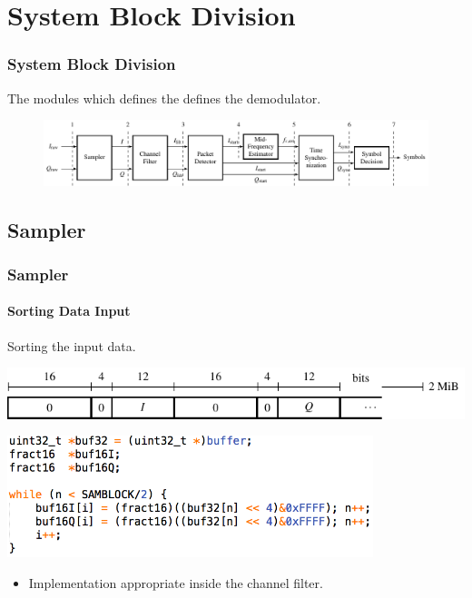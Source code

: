 
\section{System Block Division}
\begin{frame}[c] \frametitle{System Block Division}
The modules which defines the defines the demodulator.
    \begin{figure}[htbp]
        \centering
        \includegraphics[width=1\textwidth]{img/interfaces}
    \end{figure}
\end{frame}


\subsection{Sampler} \label{sec:sampler}

\begin{frame} \frametitle{Sampler}
    \framesubtitle{Sorting Data Input}
Sorting the input data.
    \begin{center}
        \includegraphics[width=1\textwidth]{img/sampler1}
    \end{center}





    \begin{center}
        \includegraphics[width=0.8\textwidth]{img/sampler_snippet}
    \end{center}
    \begin{itemize}
        \item Implementation appropriate inside the channel filter.
    \end{itemize}
\end{frame}


